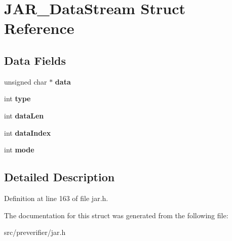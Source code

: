 \section{JAR\_\-DataStream Struct Reference}
\label{struct_j_a_r___data_stream}
\subsection*{Data Fields}
\begin{DoxyCompactItemize}
\item 
unsigned char $\ast$ {\bfseries data}\label{struct_j_a_r___data_stream_ab32aafa47e941ee597402ceb7c0e283c}

\item 
int {\bfseries type}\label{struct_j_a_r___data_stream_a7d5975319cb95a69c44d64d8b9fd18a5}

\item 
int {\bfseries dataLen}\label{struct_j_a_r___data_stream_ae19f05611effb8c01b0dad929a6df48d}

\item 
int {\bfseries dataIndex}\label{struct_j_a_r___data_stream_a64392fb43a7627a655311cde5e5e671e}

\item 
int {\bfseries mode}\label{struct_j_a_r___data_stream_a434cb44ee4daa3c400d31b5bda4780a7}

\end{DoxyCompactItemize}


\subsection{Detailed Description}


Definition at line 163 of file jar.h.



The documentation for this struct was generated from the following file:\begin{DoxyCompactItemize}
\item 
src/preverifier/jar.h\end{DoxyCompactItemize}

